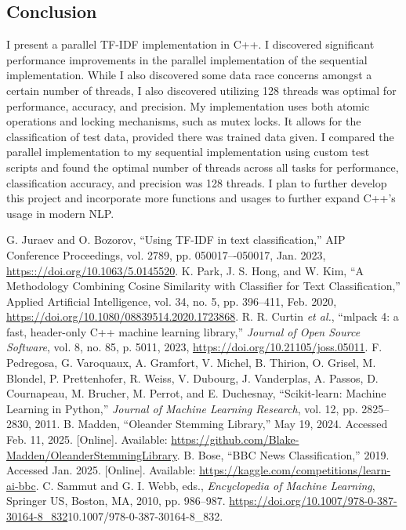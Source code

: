 \documentclass[conference]{IEEEtran}
\begin{document}
\subsection{Conclusion}
I present a parallel TF-IDF implementation in C++. I discovered significant performance improvements in the parallel implementation of the sequential implementation. While I also discovered some data race concerns amongst a certain number of threads, I also discovered utilizing 128 threads was optimal for performance, accuracy, and precision. My implementation uses both atomic operations and locking mechanisms, such as mutex locks. It allows for the classification of test data, provided there was trained data given. I compared the parallel implementation to my sequential implementation using custom test scripts and found the optimal number of threads across all tasks for performance, classification accuracy, and precision was 128 threads. I plan to further develop this project and incorporate more functions and usages to further expand C++’s usage in modern NLP.

\begin{thebibliography}{00}
 G. Juraev and O. Bozorov, ``Using TF-IDF in text classification,'' AIP Conference Proceedings, vol. 2789, pp. 050017–-050017, Jan. 2023, \url{https:://doi.org/10.1063/5.0145520}.
 K. Park, J. S. Hong, and W. Kim, ``A Methodology Combining Cosine Similarity with Classifier for Text Classification,'' Applied Artificial Intelligence, vol. 34, no. 5, pp. 396--411, Feb. 2020, \url{https://doi.org/10.1080/08839514.2020.1723868}.
 R. R. Curtin \textit{et al.}, ``mlpack 4: a fast, header-only C++ machine learning library,'' \textit{Journal of Open Source Software}, vol. 8, no. 85, p. 5011, 2023, \url{https://doi.org/10.21105/joss.05011}.
 F. Pedregosa, G. Varoquaux, A. Gramfort, V. Michel, B. Thirion, O. Grisel, M. Blondel, P. Prettenhofer, R. Weiss, V. Dubourg, J. Vanderplas, A. Passos, D. Cournapeau, M. Brucher, M. Perrot, and E. Duchesnay, ``Scikit-learn: Machine Learning in Python,'' \textit{Journal of Machine Learning Research}, vol. 12, pp. 2825--2830, 2011.
 B. Madden, ``Oleander Stemming Library,'' May 19, 2024. Accessed Feb. 11, 2025. [Online]. Available: \url{https://github.com/Blake-Madden/OleanderStemmingLibrary}.
 B. Bose, ``BBC News Classification,'' 2019. Accessed Jan. 2025. [Online]. Available: \url{https://kaggle.com/competitions/learn-ai-bbc}.
 C. Sammut and G. I. Webb, eds., \textit{Encyclopedia of Machine Learning}, Springer US, Boston, MA, 2010, pp. 986--987. \url{https://doi.org/10.1007/978-0-387-30164-8_832}{10.1007/978-0-387-30164-8\_832}.
\end{thebibliography}
\end{document}
